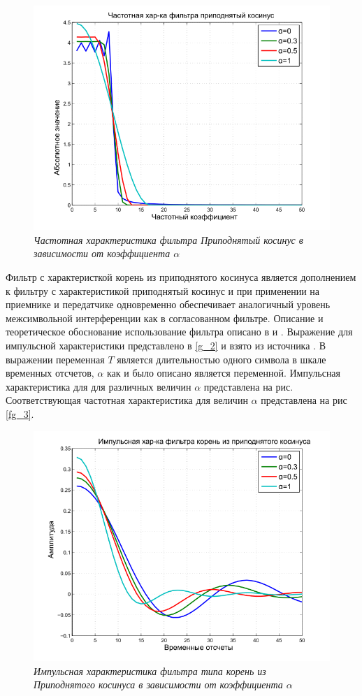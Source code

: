 \begin{figure}[H]
\centering
\includegraphics[width=0.9\columnwidth]{RC_freq.png}
\caption{\textit{Частотная характеристика фильтра Приподнятый косинус в зависимости от коэффициента $\alpha$}} 
\label{fg_2}
\end{figure}
Фильтр с характеристкой корень из приподнятого косинуса является дополнением к фильтру с характеристикой приподнятый косинус и при применении на приемнике и передатчике одновременно обеспечивает аналогичный уровень  межсимвольной интерференции как в согласованном фильтре. Описание и теоретическое обоснование использование фильтра описано в \cite{Book23} \cite{Book44} и \cite{Book51}. Выражение для импульсной характеристики представлено в \eqref{g_2} и взято из источника \cite{Book23}. В выражении переменная $T$ является длительностью одного символа в шкале временных отсчетов, $\alpha$ как и было описано является переменной. Импульсная характеристика для для различных величин $\alpha$ представлена на рис. Соответствующая частотная характеристика для величин $\alpha$ представлена на рис \eqref{fg_3}. 
\begin{figure}[H]
\centering
\includegraphics[width=0.9\columnwidth]{RRC_time.png}
\caption{\textit{Импульсная характеристика фильтра типа корень из Приподнятого косинуса в зависимости от коэффициента $\alpha$}} \label{fg_3}
\end{figure}
